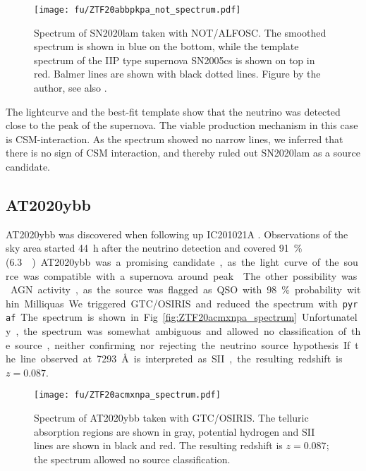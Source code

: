 \begin{figure}[h!]
    \texttt{[image: fu/ZTF20abbpkpa\_not\_spectrum.pdf]}
    \caption[SN2020lam spectrum]{Spectrum of SN2020lam taken with NOT/ALFOSC. The smoothed spectrum is shown in blue on the bottom, while the template spectrum of the IIP type supernova SN2005cs is shown on top in red. Balmer lines are shown with black dotted lines. Figure by the author, see also \cite{Stein2023a}.}
\end{figure}
The lightcurve and the best-fit template show that the neutrino was detected close to the peak of the supernova. The viable production mechanism in this case is CSM-interaction. As the spectrum showed no narrow lines, we inferred that there is no sign of CSM interaction, and thereby ruled out SN2020lam as a source candidate.

\subsection{AT2020ybb}
AT2020ybb was discovered when following up IC201021A . Observations of the sky area started \SI{44}{\hour} after the neutrino detection and covered \SI{91}{\percent} (\SI{6.3}{\square\deg}).

AT2020ybb was a promising candidate, as the light curve of the source was compatible with a supernova around peak . The other possibility was AGN activity, as the source was flagged as QSO with \SI{98}{\percent} probability within Milliquas.

We triggered GTC/OSIRIS and reduced the spectrum with \texttt{pyraf}. The spectrum is shown in Fig. \ref{fig:ZTF20acmxnpa_spectrum}. Unfortunately, the spectrum was somewhat ambiguous and allowed no classification of the source, neither confirming nor rejecting the neutrino source hypothesis. If the line observed at \SI{7293}{\angstrom} is interpreted as SII, the resulting redshift is $z=0.087$.

\begin{figure}[htb]
    \texttt{[image: fu/ZTF20acmxnpa\_spectrum.pdf]}
    \caption[AT2020ybb spectrum]{Spectrum of AT2020ybb taken with GTC/OSIRIS. The telluric absorption regions are shown in gray, potential hydrogen and SII lines are shown in black and red. The resulting redshift is $z=0.087$; the spectrum allowed no source classification.}
\end{figure}

